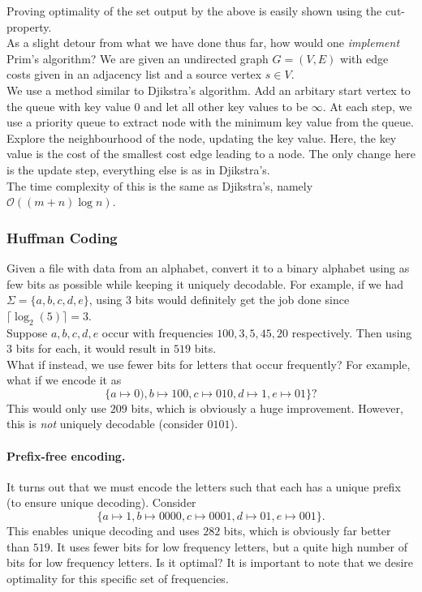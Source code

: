 Proving optimality of the set output by the above is easily shown using the cut-property.\\

As a slight detour from what we have done thus far, how would one \textit{implement} Prim's algorithm? We are given an undirected graph $G=(V,E)$ with edge costs given in an adjacency list and a source vertex $s\in V$.\\
We use a method similar to Djikstra's algorithm. Add an arbitary start vertex to the queue with key value $0$ and let all other key values to be $\infty$. At each step, we use a priority queue to extract node with the minimum key value from the queue. Explore the neighbourhood of the node, updating the key value. Here, the key value is the cost of the smallest cost edge leading to a node. The only change here is the update step, everything else is as in Djikstra's.\\
The time complexity of this is the same as Djikstra's, namely $\mathcal{O}((m+n)\log n)$.

\subsubsection{Huffman Coding}

Given a file with data from an alphabet, convert it to a binary alphabet using as few bits as possible while keeping it uniquely decodable. For example, if we had $\Sigma=\{a,b,c,d,e\}$, using $3$ bits would definitely get the job done since $\lceil \log_2(5)\rceil = 3$.\\
Suppose $a,b,c,d,e$ occur with frequencies $100,3,5,45,20$ respectively. Then using $3$ bits for each, it would result in $519$ bits.\\
What if instead, we use fewer bits for letters that occur frequently? For example, what if we encode it as
\[ \{a\mapsto 0),b\mapsto 100,c\mapsto 010,d\mapsto 1,e\mapsto 01\}? \] This would only use $209$ bits, which is obviously a huge improvement. However, this is \textit{not} uniquely decodable (consider $0101$).\\

\paragraph{Prefix-free encoding.} It turns out that we must encode the letters such that each has a unique prefix (to ensure unique decoding). Consider
\[ \{a\mapsto 1, b\mapsto 0000, c\mapsto 0001, d\mapsto 01, e\mapsto 001\}. \]
This enables unique decoding and uses $282$ bits, which is obviously far better than $519$. It uses fewer bits for low frequency letters, but a quite high number of bits for low frequency letters. Is it optimal? It is important to note that we desire optimality for this specific set of frequencies.

